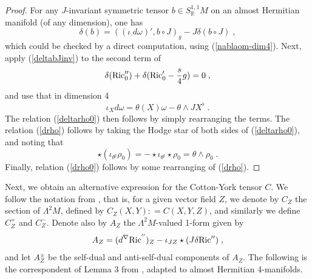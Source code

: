 \documentclass{amsart}
\newcommand{\La}{\Lambda}
\begin{document}

\begin{proof}
For any $J$-invariant symmetric tensor $b \in S^{1,1}_{\mathbb{R}} M$ on an almost Hermitian manifold (of any dimension), one has 
\begin{equation} \label{deltabJinv}
\delta(b) = ( (\iota_{\cdot} d \omega)' , b \circ J )_g - J \delta(b \circ J)  \; , 
\end{equation}
which could be checked by a direct computation, using (\ref{nablaom-dim4}).
Next, apply (\ref{deltabJinv}) to the second term of 
$$\delta ({\rm Ric}_0'') + \delta ({\rm Ric}_0' - \frac{s}{4} g) = 0 \; ,$$ and use that in dimension 4
$$\iota_X d \omega = \theta(X) \omega - \theta \wedge JX^\flat \; .$$
The relation (\ref{deltarho0}) then follows by simply rearranging the terms. The relation (\ref{drho}) follows by taking the Hodge star of both sides of (\ref{deltarho0}), and noting that 
$$ \star (\iota_{\theta^\sharp} \rho_0) = - \star \iota_{\theta^\sharp} \star \rho_0 =  \theta \wedge \rho_0 \; .$$
Finally, relation (\ref{drho0}) follows by some rearranging of (\ref{drho}).
\end{proof}

Next, we obtain an alternative expression for the Cotton-York tensor $C$.
We follow the notation from \cite{AAD}, that is, for a given vector field $Z$, we denote by $C_Z$  the section of
$\La^2 M$,  defined  by  $C_Z (X,Y): = C(X,Y,Z)$, and similarly we
define $C^+_Z$ and $C^-_Z$. Denote also by $A_Z$ the
$\La^2M$-valued 1-form given by
$$A_Z  = (d^{\nabla} {\rm Ric}^{''})_{Z} - \iota_{JZ}\star(J \delta {\rm Ric}'') \; ,$$
and let $A^{\pm}_Z$ be the self-dual and  anti-self-dual components of
$A_Z$. The following is the correspondent of Lemma 3 from \cite{AAD}, adapted to almost Hermitian 4-manifolds.
%
\end{document}
